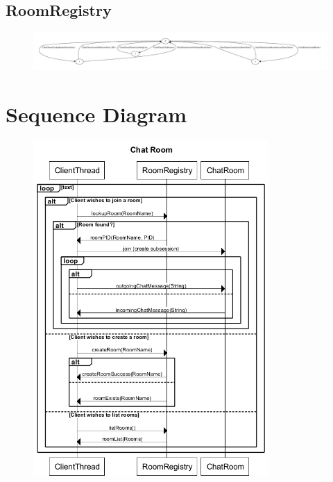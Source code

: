 \documentclass[a4paper]{article}
\begin{document}
\subsection{RoomRegistry}
\begin{figure}[H]
\centering
\includegraphics[width=\textwidth]{chatserver_roomregistry_dot.pdf}
\end{figure}

\section{Sequence Diagram}

\begin{figure}[H]
\centering
\includegraphics[width=0.8\textwidth]{Chat_Room.png}
\end{figure}



\end{document}
